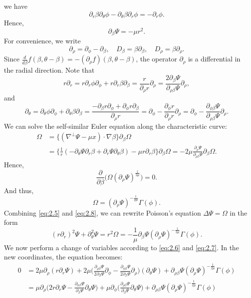 \documentclass[11pt]{article}
\theoremstyle{definition}
\theoremstyle{remark}
\numberwithin{equation}{section}
\newcommand{\del}{\partial}
\newcommand{\grad}{\nabla}
\begin{document}
we have
\[\del_r \beta \del_\theta \phi - \del_\theta \beta \del_r \phi = - \del_r \phi.\]
Hence,
\begin{equation} \label{eq:2.5}
\del_\beta \Psi = -\mu r^2.
\end{equation}
For convenience, we write
\begin{equation*}
\del_\rho = \del_\phi - \del_\beta, \quad D_\beta = \beta \del_\beta, \quad D_\rho = \beta \del_\rho.
\end{equation*}
Since $\frac{d}{d\beta}f(\beta, \theta - \beta) = - (\del_\rho f)(\beta, \theta - \beta)$, the operator $\del_\rho$ is a differential in the radial direction. Note that
\begin{equation} \label{eq:2.6}
r\del_r =r \del_r \phi \del_\phi + r\del_r \beta \del_\beta = \frac{r}{\del_\rho r} \del_\rho = \frac{2\del_\beta\Psi}{\del_{\rho\beta} \Psi} \del_\rho,
\end{equation}
and
\begin{equation} \label{eq:2.7}
\del_\theta = \del_\theta \phi \del_\phi + \del_\theta \beta \del_\beta = \frac{-\del_\beta r \del_\phi + \del_\phi r \del_\beta}{\del_\rho r} = \del_\phi - \frac{\del_\phi r}{\del_\rho r} \del_\rho = \del_\phi - \frac{\del_{\phi\beta} \Psi}{\del_{\rho\beta}\Psi} \del_\rho.
\end{equation}
We can solve the self-similar Euler equation along the characteristic curve:
\begin{align*}
\Omega &= \{(\grad^\perp \Psi - \mu x) \cdot \grad \beta \} \del_\beta \Omega \\
&= \Big\{\frac{1}{r} (-\del_\theta \Psi \del_r \beta + \del_r \Psi \del_\theta \beta) - \mu r \del_r \beta \Big\} \del_\beta \Omega = -2\mu\frac{\del_\rho\Psi}{\del_{\rho\beta} \Psi} \del_\beta \Omega.
\end{align*}
Hence,
\[\frac{\del}{\del\beta} \Big( \Omega (\del_\rho \Psi)^{\frac{1}{2\mu}} \Big) = 0.\]
And thus,
\begin{equation} \label{eq:2.8}
\Omega = (\del_\rho\Psi)^{-\frac{1}{2\mu}} \Gamma(\phi).
\end{equation}
Combining \eqref{eq:2.5} and \eqref{eq:2.8}, we can rewrite Poisson’s equation $\Delta \Psi = \Omega$ in the form
\[(r\del_r)^2 \Psi + \del_{\theta}^2 \Psi = r^2 \Omega = -\frac{1}{\mu} \del_\beta \Psi (\del_\rho \Psi)^{-\frac{1}{2\mu}} \Gamma(\phi).\]
We now perform a change of variables according to \eqref{eq:2.6} and \eqref{eq:2.7}. In the new coordinates, the equation becomes:
\begin{align*}
0 &= 2\mu \del_\rho(r\del_r \Psi) + 2\mu \bigg( \frac{\del_{\rho\beta} \Psi}{2\del_\beta \Psi} \del_\phi - \frac{\del_{\phi\beta} \Psi}{2\del_\beta \Psi} \del_\rho \bigg) (\del_\theta \Psi) + \del_{\rho\beta} \Psi (\del_\rho \Psi)^{-\frac{1}{2\mu}} \Gamma(\phi) \\
&= \mu \del_\rho \bigg(2 r\del_r \Psi - \frac{\del_{\phi\beta} \Psi}{\del_\beta \Psi} \del_\theta \Psi \bigg) + \mu \del_\phi \bigg( \frac{\del_{\rho\beta} \Psi}{\del_\beta \Psi} \del_\theta \Psi \bigg) + \del_{\rho\beta} \Psi (\del_\rho \Psi)^{-\frac{1}{2\mu}} \Gamma(\phi)
\end{align*}
\end{document}
